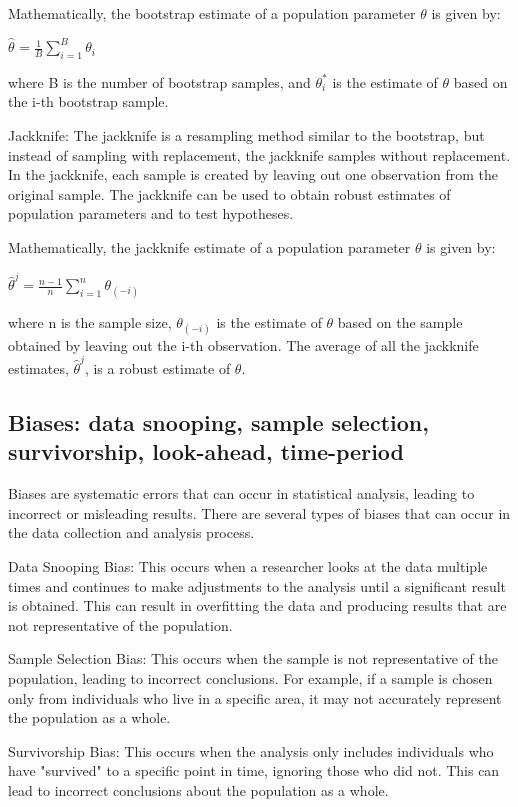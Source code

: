 \documentclass[12pt, a4paper, oneside]{article}
\begin{document}
Mathematically, the bootstrap estimate of a population parameter $\theta$ is given by:

$\hat{\theta}^{} = \frac{1}{B} \sum_{i=1}^{B} \theta^{}_{i}$

where B is the number of bootstrap samples, and $\theta^{*}_{i}$ is the estimate of $\theta$ based on the i-th bootstrap sample.

Jackknife:
The jackknife is a resampling method similar to the bootstrap, but instead of sampling with replacement, the jackknife samples without replacement. In the jackknife, each sample is created by leaving out one observation from the original sample. The jackknife can be used to obtain robust estimates of population parameters and to test hypotheses.

Mathematically, the jackknife estimate of a population parameter $\theta$ is given by:

$\hat{\theta}^{j} = \frac{n-1}{n} \sum_{i=1}^{n} \theta_{(-i)}$

where n is the sample size, $\theta_{(-i)}$ is the estimate of $\theta$ based on the sample obtained by leaving out the i-th observation. The average of all the jackknife estimates, $\hat{\theta}^{j}$, is a robust estimate of $\theta$.








\subsection{ Biases: data snooping, sample selection, survivorship, look-ahead, time-period }
Biases are systematic errors that can occur in statistical analysis, leading to incorrect or misleading results. There are several types of biases that can occur in the data collection and analysis process.

Data Snooping Bias: This occurs when a researcher looks at the data multiple times and continues to make adjustments to the analysis until a significant result is obtained. This can result in overfitting the data and producing results that are not representative of the population.

Sample Selection Bias: This occurs when the sample is not representative of the population, leading to incorrect conclusions. For example, if a sample is chosen only from individuals who live in a specific area, it may not accurately represent the population as a whole.

Survivorship Bias: This occurs when the analysis only includes individuals who have "survived" to a specific point in time, ignoring those who did not. This can lead to incorrect conclusions about the population as a whole.
\end{document}
